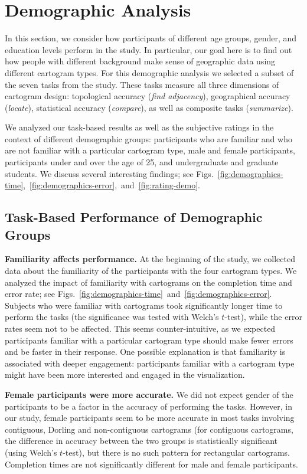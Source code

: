 \documentclass[10pt,journal,compsoc]{IEEEtran}
\begin{document}
\section{Demographic Analysis}

In this section, we consider how participants of different age groups, gender, and education levels perform in the study. In particular, our goal here is to find out how people with different background make sense of geographic data using different cartogram types. For this demographic analysis we selected a subset of the seven tasks from the study. These tasks measure all three dimensions of cartogram design: topological accuracy (\textit{find adjacency}), geographical accuracy (\textit{locate}), statistical accuracy (\textit{compare}), as well as composite tasks (\textit{summarize}).


We analyzed our task-based results as well as the subjective ratings in the context of different demographic groups: participants who are familiar and who are not familiar  with a particular cartogram type, male and female participants, participants under and over the age of 25, and undergraduate and graduate students. We discuss several interesting findings; see Figs.~\ref{fig:demographics-time},~\ref{fig:demographics-error},~and~\ref{fig:rating-demo}.


\subsection{Task-Based Performance of Demographic Groups}


 \textbf{Familiarity affects performance.} At the beginning of the study, we collected data about the familiarity of the participants with the four cartogram types. We analyzed the impact of familiarity with cartograms on the completion time and error rate; see Figs.~\ref{fig:demographics-time}~and~\ref{fig:demographics-error}. Subjects who were familiar with cartograms took significantly longer time to perform the tasks (the significance was tested with Welch's $t$-test), while the error rates seem not to be affected.
This seems counter-intuitive, as we expected participants familiar with a particular cartogram type should make fewer errors and be faster in their response.
One possible explanation is that familiarity is associated with deeper engagement: participants familiar with a cartogram type might have been more interested and engaged in the visualization.


\noindent
\textbf{Female participants were more accurate.}
We did not expect gender of the participants to be a factor in the accuracy of performing the tasks. However, in our study, female participants seem to be more accurate in most tasks involving contiguous, Dorling and non-contiguous cartograms (for contiguous cartograms, the difference in accuracy between the two groups is statistically significant (using Welch's $t$-test), but there is no such pattern for rectangular cartograms.  Completion times are not significantly different for male and female participants. 
\end{document}
